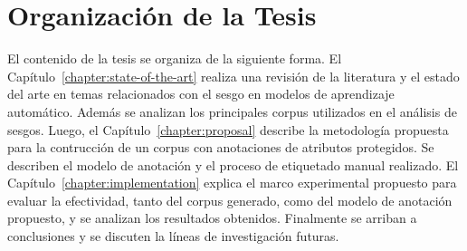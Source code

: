 \section*{Organizaci\'on de la Tesis}
El contenido de la tesis se organiza de la siguiente forma. El Cap\'itulo~\ref{chapter:state-of-the-art} realiza una revisi\'on de 
la literatura y el estado del arte en temas relacionados con el sesgo en modelos de aprendizaje autom\'atico. Adem\'as se analizan 
los principales corpus utilizados en el an\'alisis de sesgos. Luego, el Cap\'itulo~\ref{chapter:proposal} describe la metodolog\'ia 
propuesta para la contrucci\'on de un corpus con anotaciones de atributos protegidos. Se describen el modelo de anotaci\'on y el 
proceso de etiquetado manual realizado. El Cap\'itulo~\ref{chapter:implementation} explica el marco experimental propuesto para 
evaluar la efectividad, tanto del corpus generado, como del modelo de anotaci\'on propuesto, y se analizan los resultados obtenidos. 
Finalmente se arriban a conclusiones y se discuten la l\'ineas de investigaci\'on futuras.  